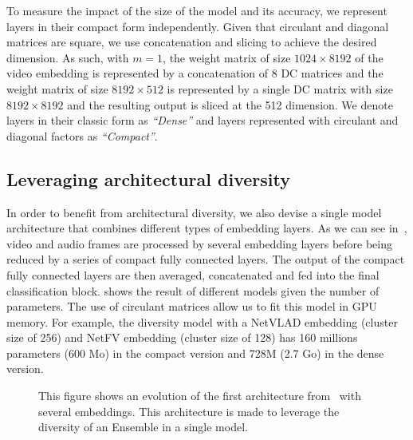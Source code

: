 To measure the impact of the size of the model and its accuracy, we represent layers in their compact form independently.
Given that circulant and diagonal matrices are square, we use concatenation and slicing to achieve the desired dimension.
As such, with $m=1$, the weight matrix of size $1024 \times 8192$ of the video embedding is represented by a concatenation of 8 DC matrices and the weight matrix of size $8192 \times 512$ is represented by a single DC matrix with size $8192 \times 8192$ and the resulting output is sliced at the 512 dimension.
We denote layers in their classic form as \emph{``Dense''} and layers represented with circulant and diagonal factors as \emph{``Compact''}.

\subsection{Leveraging architectural diversity}
\label{subsection:ap2-leveraging_architectural_diversity}

In order to benefit from architectural diversity, we also devise a single model architecture that combines different types of embedding layers.
As we can see in~, video and audio frames are processed by several embedding layers before being reduced by a series of compact fully connected layers.
The output of the compact fully connected layers are then averaged, concatenated and fed into the final classification block.
 shows the result of different models given the number of parameters.
The use of circulant matrices allow us to fit this model in GPU memory.
For example, the diversity model with a NetVLAD embedding (cluster size of 256) and NetFV embedding (cluster size of 128) has 160 millions parameters (600 Mo) in the compact version and 728M (2.7 Go) in the dense version. 

\begin{figure}[ht]
  \centering
  
  \caption{This figure shows an evolution of the first architecture from~ with several embeddings. This architecture is made to leverage the diversity of an Ensemble in a single model.}
  \label{figure:ap2-diverstiy_architecture}
\end{figure}

